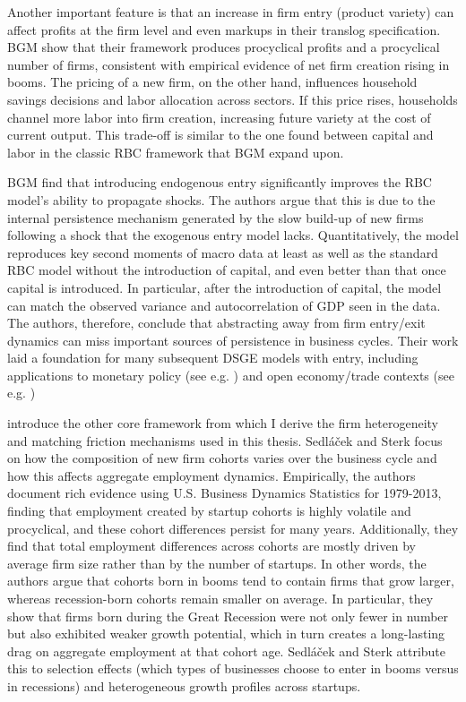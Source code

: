 \documentclass[a4paper,12pt]{article} %
\numberwithin{equation}{section} %
\numberwithin{figure}{section}
\numberwithin{table}{section}
\begin{document}
Another important feature is that an increase in firm entry (product variety) can affect profits at the firm level and even markups in their translog specification. 
BGM show that their framework produces procyclical profits and a procyclical number of firms, consistent with empirical evidence of net firm creation rising in booms. 
The pricing of a new firm, on the other hand, influences household savings decisions and labor allocation across sectors. If this price rises, households channel more 
labor into firm creation, increasing future variety at the cost of current output. This trade-off is similar to the one found between capital and labor in the classic 
RBC framework that BGM expand upon.

BGM find that introducing endogenous entry significantly improves the RBC model's ability to propagate shocks. The authors argue that this is due to the internal 
persistence mechanism generated by the slow build-up of new firms following a shock that the exogenous entry model lacks. Quantitatively, the model reproduces key 
second moments of macro data at least as well as the standard RBC model without the introduction of capital, and even better than that once capital is introduced. 
In particular, after the introduction of capital, the model can match the observed variance and autocorrelation of GDP seen in the data. The authors, therefore, 
conclude that abstracting away from firm entry/exit dynamics can miss important sources of persistence in business cycles. Their work laid a foundation for many 
subsequent DSGE models with entry, including applications to monetary policy (see e.g. \cite{bilbiie2007monetary,bergin2008extensive,etro2015new}) and 
open economy/trade contexts (see e.g. \cite{epifani2011trade,bergin2015international})

\textcite{sedlavcek2017growth} introduce the other core framework from which I derive the firm heterogeneity and matching friction mechanisms used in this thesis. 
Sedláček and Sterk focus on how the composition of new firm cohorts varies over the business cycle and how this affects aggregate employment dynamics. 
Empirically, the authors document rich evidence using U.S. Business Dynamics Statistics for 1979-2013, finding that employment created by startup cohorts is highly
volatile and procyclical, and these cohort differences persist for many years. Additionally, they find that total employment differences across cohorts are mostly
driven by average firm size rather than by the number of startups. In other words, the authors argue that cohorts born in booms tend to contain firms that grow
larger, whereas recession-born cohorts remain smaller on average. In particular, they show that firms born during the Great Recession were not only fewer in 
number but also exhibited weaker growth potential, which in turn creates a long-lasting drag on aggregate employment at that cohort age. Sedláček and Sterk 
attribute this to selection effects (which types of businesses choose to enter in booms versus in recessions) and heterogeneous growth profiles across startups.
\end{document}

